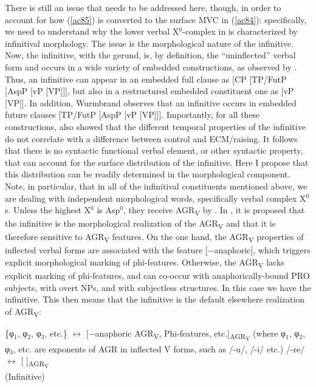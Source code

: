 \documentclass[output=paper]{langscibook}
\begin{document}
There is still an issue that needs to be addressed here, though, in order to account for how (\ref{ac85}) is converted to the surface MVC in (\ref{ac84}): specifically, we need to understand why the lower verbal X$^0$-complex in  is characterized by infinitival morphology. The issue is the morphological nature of the infinitive. Now, the infinitive, with the gerund, is, by definition, the “uninflected” verbal form and occurs in a wide variety of embedded constructions, as observed by \citet{wurmbrand2014a}.  Thus, an infinitive can appear in an embedded full clause as [CP [TP/FutP [AspP [vP [VP]]], but also in a restructured embedded constituent one as [vP [VP]].  In addition, Wurmbrand observes that an infinitive occurs in embedded future clauses  [TP/FutP [AspP [vP [VP]]]. Importantly, for all these constructions, \citet{wurmbrand2014a} also showed that the different temporal properties of the infinitive do not correlate with a difference between control and ECM/raising. It follows that there is no syntactic functional verbal element, or other syntactic property, that can account for the surface distribution of the infinitive. Here I propose that this distribution can be readily determined in the morphological component. Note, in particular, that in all of the infinitival constituents mentioned above, we are dealing with independent morphological words, specifically verbal complex X$^0$s.  Unless the highest X$^0$ is Asp$^0$, they receive AGR\textsubscript{V} by . In \citet{calabrese1993a}, it is proposed that the infinitive is the morphological realization of the  AGR\textsubscript{V} and that it is therefore sensitive to  AGR\textsubscript{V} features. On the one hand, the  AGR\textsubscript{V} properties of inflected verbal forms are associated with the feature [−anaphoric], which triggers explicit morphological marking of phi-features.  Otherwise, the  AGR\textsubscript{V} lacks explicit marking of phi-features, and can co-occur with anaphorically-bound PRO subjects, with overt NPs, and with subjectless structures. In this case we have the infinitive. This then means that the infinitive is the default elsewhere realization of AGR\textsubscript{V}:

\ea\label{ac89}
    \ea \label{ac89a}\{φ$_1$, φ$_2$, φ$_3$, etc.\} $\longleftrightarrow$ [−anaphoric  AGR\textsubscript{V}, Phi-features, etc.]\textsubscript{AGR\textsubscript{V}}
       (where φ$_1$, φ$_2$, φ$_3$, etc. are exponents of AGR in inflected V forms, such as /-u/, /-i/ etc.)
    \ex \label{ac89b}/-re/ $\longleftrightarrow$  [   ]\textsubscript{AGR\textsubscript{V}}\\(Infinitive)
    \z
\z
\end{document}
